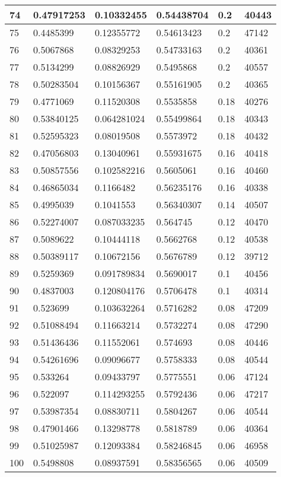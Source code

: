 \begin{longtable}{|l|l|l|l|l|l|}
74 & 0.47917253 & 0.10332455 & 0.54438704 & 0.2 & 40443 \\ \hline 
75 & 0.4485399 & 0.12355772 & 0.54613423 & 0.2 & 47142 \\ \hline 
76 & 0.5067868 & 0.08329253 & 0.54733163 & 0.2 & 40361 \\ \hline 
77 & 0.5134299 & 0.08826929 & 0.5495868 & 0.2 & 40557 \\ \hline 
78 & 0.50283504 & 0.10156367 & 0.55161905 & 0.2 & 40365 \\ \hline 
79 & 0.4771069 & 0.11520308 & 0.5535858 & 0.18 & 40276 \\ \hline 
80 & 0.53840125 & 0.064281024 & 0.55499864 & 0.18 & 40343 \\ \hline 
81 & 0.52595323 & 0.08019508 & 0.5573972 & 0.18 & 40432 \\ \hline 
82 & 0.47056803 & 0.13040961 & 0.55931675 & 0.16 & 40418 \\ \hline 
83 & 0.50857556 & 0.102582216 & 0.5605061 & 0.16 & 40460 \\ \hline 
84 & 0.46865034 & 0.1166482 & 0.56235176 & 0.16 & 40338 \\ \hline 
85 & 0.4995039 & 0.1041553 & 0.56340307 & 0.14 & 40507 \\ \hline 
86 & 0.52274007 & 0.087033235 & 0.564745 & 0.12 & 40470 \\ \hline 
87 & 0.5089622 & 0.10444118 & 0.5662768 & 0.12 & 40538 \\ \hline 
88 & 0.50389117 & 0.10672156 & 0.5676789 & 0.12 & 39712 \\ \hline 
89 & 0.5259369 & 0.091789834 & 0.5690017 & 0.1 & 40456 \\ \hline 
90 & 0.4837003 & 0.120804176 & 0.5706478 & 0.1 & 40314 \\ \hline 
91 & 0.523699 & 0.103632264 & 0.5716282 & 0.08 & 47209 \\ \hline 
92 & 0.51088494 & 0.11663214 & 0.5732274 & 0.08 & 47290 \\ \hline 
93 & 0.51436436 & 0.11552061 & 0.574693 & 0.08 & 40446 \\ \hline 
94 & 0.54261696 & 0.09096677 & 0.5758333 & 0.08 & 40544 \\ \hline 
95 & 0.533264 & 0.09433797 & 0.5775551 & 0.06 & 47124 \\ \hline 
96 & 0.522097 & 0.114293255 & 0.5792436 & 0.06 & 47217 \\ \hline 
97 & 0.53987354 & 0.08830711 & 0.5804267 & 0.06 & 40544 \\ \hline 
98 & 0.47901466 & 0.13298778 & 0.5818789 & 0.06 & 40364 \\ \hline 
99 & 0.51025987 & 0.12093384 & 0.58246845 & 0.06 & 46958 \\ \hline 
100 & 0.5498808 & 0.08937591 & 0.58356565 & 0.06 & 40509 \\ \hline 
\end{longtable}